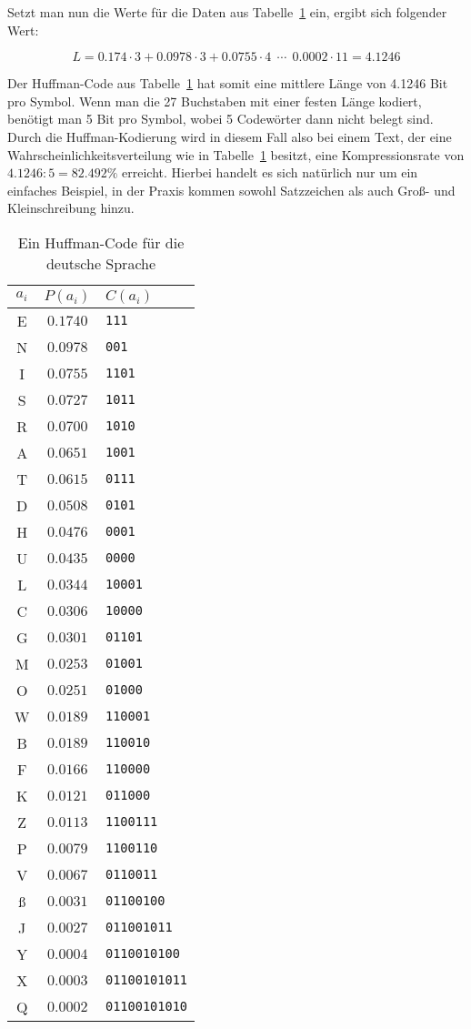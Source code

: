 \documentclass[twoside,11pt,a4paper]{article}
\theoremstyle{break}
\begin{document}
Setzt man nun die Werte für die Daten aus Tabelle~\ref{tab:HGER} ein,
ergibt sich folgender Wert:

\begin{equation}
L = 0.174 \cdot 3 + 0.0978 \cdot 3 + 0.0755 \cdot 4\ \ \cdots\ \ 0.0002 \cdot 11 = 4.1246
\end{equation}

Der Huffman-Code aus Tabelle~\ref{tab:HGER} hat somit eine mittlere
Länge von 4.1246 Bit pro Symbol. Wenn man die 27 Buchstaben mit einer
festen Länge kodiert, benötigt man 5 Bit pro Symbol, wobei 5
Codewörter dann nicht belegt sind. Durch die Huffman-Kodierung wird in
diesem Fall also bei einem Text, der eine
Wahrscheinlichkeitsverteilung wie in Tabelle~\ref{tab:HGER} besitzt,
eine Kompressionsrate von $4.1246 : 5 = 82.492 \%$ erreicht. Hierbei
handelt es sich natürlich nur um ein einfaches Beispiel, in der Praxis
kommen sowohl Satzzeichen als auch Groß- und Kleinschreibung hinzu.

\begin{table}
\centering
\caption{Ein Huffman-Code für die deutsche Sprache}
\vspace{1ex}
\begin{tabular}{c|c|l}
$a_i$ & $P(a_i)$ & $C(a_i)$ \\ \hline
E & $0.1740$ & {\tt111} \\
N & $0.0978$ & {\tt001} \\
I & $0.0755$ & {\tt1101} \\
S & $0.0727$ & {\tt1011} \\
R & $0.0700$ & {\tt1010} \\
A & $0.0651$ & {\tt1001} \\
T & $0.0615$ & {\tt0111} \\
D & $0.0508$ & {\tt0101} \\
H & $0.0476$ & {\tt0001} \\
U & $0.0435$ & {\tt0000} \\
L & $0.0344$ & {\tt10001} \\
C & $0.0306$ & {\tt10000} \\
G & $0.0301$ & {\tt01101} \\
M & $0.0253$ & {\tt01001} \\
O & $0.0251$ & {\tt01000} \\
W & $0.0189$ & {\tt110001} \\
B & $0.0189$ & {\tt110010} \\
F & $0.0166$ & {\tt110000} \\
K & $0.0121$ & {\tt011000} \\
Z & $0.0113$ & {\tt1100111} \\
P & $0.0079$ & {\tt1100110} \\
V & $0.0067$ & {\tt0110011} \\
ß & $0.0031$ & {\tt01100100} \\
J & $0.0027$ & {\tt011001011} \\
Y & $0.0004$ & {\tt0110010100} \\
X & $0.0003$ & {\tt01100101011} \\
Q & $0.0002$ & {\tt01100101010}
\end{tabular}
\label{tab:HGER}
\end{table}
\end{document}
